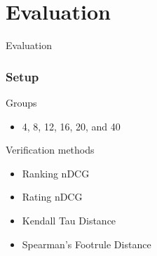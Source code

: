 \section{Evaluation}
\begin{frame}
     \begin{center}
     	\huge Evaluation 
     \end{center}
\end{frame}

\begin{frame}
\frametitle{Setup}
Groups
\begin{itemize}
\item 4, 8, 12, 16, 20, and 40
\end{itemize}

Verification methods
\begin{itemize}
\item Ranking nDCG
\item Rating nDCG
\item Kendall Tau Distance 
\item Spearman's Footrule Distance 
\end{itemize}
\end{frame}

